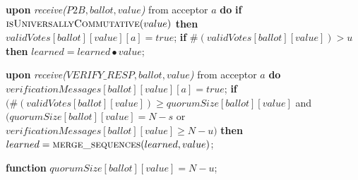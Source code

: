 \begin{algorithm}
\begin{algorithmic}[1]
			\State
		\State \textbf{upon} \textit{receive($P2B, ballot, value$)} from acceptor $a$ \textbf{do}
		\State \hspace{\algorithmicindent} \textbf{if} $\Call{isUniversallyCommutative}{value}$ \textbf{then}
		\State \hspace{\algorithmicindent}\hspace{\algorithmicindent}
		$validVotes[ballot][value][a] = true$;
		\State \hspace{\algorithmicindent}\hspace{\algorithmicindent} \textbf{if} $\#(validVotes[ballot][value]) > u$ \textbf{then} 
		\State \hspace{\algorithmicindent}\hspace{\algorithmicindent}\hspace{\algorithmicindent} $learned = learned \bullet value$;
		
		\State
		\State \textbf{upon} \textit{receive($VERIFY\_RESP, ballot, value$)} from acceptor $a$ \textbf{do}
		\State \hspace{\algorithmicindent} $verificationMessages[ballot][value][a]  = true$;
		\State \hspace{\algorithmicindent} \textbf{if} $(\#(validVotes[ballot][value]) \geq quorumSize[ballot][value]$ and $(quorumSize[ballot][value] = N-s$ or $verificationMessages[ballot][value] \geq N-u)$ \textbf{then}
		\State \hspace{\algorithmicindent}\hspace{\algorithmicindent} $learned = \Call{merge\_sequences}{learned, value}$;
		
		\State
		\State
		\textbf{function} 
		\State \hspace{\algorithmicindent} $quorumSize[ballot][value] = N-u$;


\end{algorithmic}
\end{algorithm}
